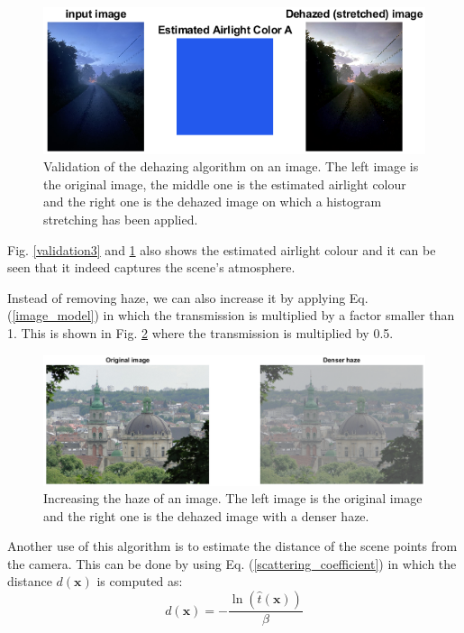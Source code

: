 \documentclass[conference]{IEEEtran}
\begin{document}
\begin{figure}
    \centering
    \includegraphics[width=\linewidth]{img/validation4.png}
    \caption{Validation of the dehazing algorithm on an image. The left image is the original image, the middle one is the estimated airlight colour and the right one is the dehazed image on which a histogram stretching has been applied.}
    \label{validation4}
\end{figure}
Fig. \ref{validation3} and \ref{validation4} also shows the estimated airlight colour and it can be seen that it indeed captures the scene's atmosphere. \par
Instead of removing haze, we can also increase it by applying Eq. (\ref{image_model}) in which the transmission is multiplied by a factor smaller than 1. This is shown in Fig. \ref{denser_haze} where the transmission is multiplied by 0.5.
\begin{figure}
    \centering
    \includegraphics[width=\linewidth]{img/denser_haze.png}
    \caption{Increasing the haze of an image. The left image is the original image and the right one is the dehazed image with a denser haze.}
    \label{denser_haze}
\end{figure}
Another use of this algorithm is to estimate the distance of the scene points from the camera. This can be done by using Eq. (\ref{scattering_coefficient}) in which the distance $d(\mathbf{x})$ is computed as:
\begin{equation}
    d(\mathbf{x}) = -\frac{\ln(\hat{t}(\mathbf{x}))}{\beta}
\end{equation}
\end{document}

